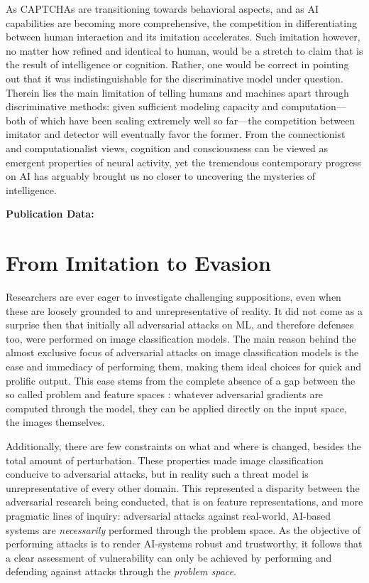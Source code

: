 As CAPTCHAs are transitioning towards behavioral aspects, and as AI capabilities are becoming more comprehensive, the competition in differentiating between human interaction and its imitation accelerates.
Such imitation however, no matter how refined and identical to human, would be a stretch to claim that is the result of intelligence or cognition.
Rather, one would be correct in pointing out that it was indistinguishable for the discriminative model under question.
Therein lies the main limitation of telling humans and machines apart through discriminative methods: given sufficient modeling capacity and computation---both of which have been scaling extremely well so far---the competition between imitator and detector will eventually favor the former.
From the connectionist and computationalist views, cognition and consciousness can be viewed as emergent properties of neural activity, yet the tremendous contemporary progress on \gls{AI} has arguably brought us no closer to uncovering the mysteries of intelligence.

\textbf{Publication Data:} 

\section{From Imitation to Evasion}

Researchers are ever eager to investigate challenging suppositions, even when these are loosely grounded to and unrepresentative of reality.
It did not come as a surprise then that initially all adversarial attacks on \gls{ML}, and therefore defenses too, were performed on image classification models.
The main reason behind the almost exclusive focus of adversarial attacks on image classification models  is the ease and immediacy of performing them, making them ideal choices for quick and prolific output.
This ease stems from the complete absence of a gap between the so called problem and feature spaces \cite{pierazzi2020intriguing}: whatever adversarial gradients are computed through the model, they can be applied directly on the input space, the images themselves.

Additionally, there are few constraints on what and where is changed, besides the total amount of perturbation.
These properties made image classification conducive to adversarial attacks, but in reality such a threat model is unrepresentative of every other domain.
This represented a disparity between the adversarial research being conducted, that is on feature representations, and more pragmatic lines of inquiry:
adversarial attacks against real-world, AI-based systems are \textit{necessarily} performed through the problem space.
As the objective of performing attacks is to render AI-systems robust and trustworthy, it follows that a clear assessment of vulnerability can only be achieved by performing and defending against attacks through the \textit{problem space}.

